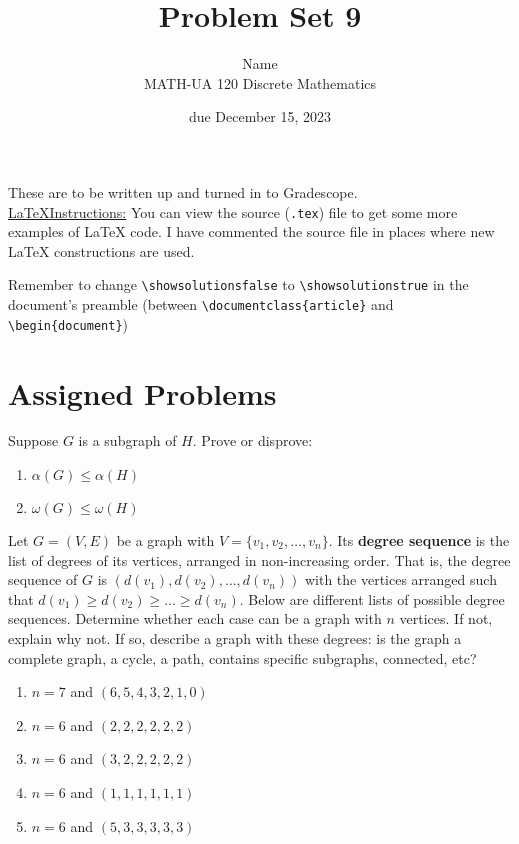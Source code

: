 \documentclass{article}
\title{Problem Set 9}
\author{%
    Name
\\  MATH-UA 120 Discrete Mathematics
}
\date{due December 15, 2023}
\newif\ifshowsolutions
\newcommand{\danger}{\marginpar[\hfill\dbend]{\dbend\hfill}}
\theoremstyle{definition}
\begin{document}
\maketitle



These are to be written up and turned in to Gradescope.\\



\ifshowsolutions
    \SetupExSheets{solution/print=true}
\else
    \danger
 \underline{ \LaTeX  Instructions:}  You can view the source (\texttt{.tex}) file to get some more examples of \LaTeX{} code.  I have commented the source file in places where new \LaTeX{} constructions are used.
  
  Remember to change \verb|\showsolutionsfalse| to \verb|\showsolutionstrue|
    in the document's preamble 
    (between \verb|\documentclass{article}| and \verb|\begin{document}|)
\fi

\section*{Assigned Problems}

\begin{question}
    Suppose $G$ is a subgraph of $H$.  Prove or disprove:
\begin{enumerate}
	\item $\alpha(G) \leq \alpha(H)$
	\item $\omega(G) \leq \omega(H)$
	\end{enumerate}
\end{question}
\begin{solution}
\end{solution}


\begin{question}
    Let $G=(V, E)$ be a graph with $V=\{v_1, v_2, \dots, v_n\}$. Its \textbf{degree sequence} is the list of degrees of its vertices, arranged in non-increasing order. That is, the degree sequence of $G$ is $(d(v_1), d(v_2), \dots, d(v_n))$ with the vertices arranged such that $d(v_1)\geq  d(v_2) \geq \dots \geq d(v_n)$. Below are different lists of possible degree sequences. Determine whether each case can be a graph with $n$ vertices. If not, explain why not. If so, describe a graph with these degrees: is the graph a complete graph, a cycle, a path, contains specific subgraphs, connected, etc?
\begin{enumerate}
	\item $n=7$ and $(6, 5, 4, 3, 2, 1, 0)$
	\item $n=6$ and $(2, 2, 2, 2, 2, 2)$
	\item $n=6$ and $(3, 2, 2, 2, 2, 2)$
	\item $n=6$ and $(1, 1, 1, 1, 1, 1)$
	\item $n=6$ and $(5, 3, 3, 3, 3, 3)$
	\end{enumerate}
\end{question}
\begin{solution}
\end{solution}
\end{document}
